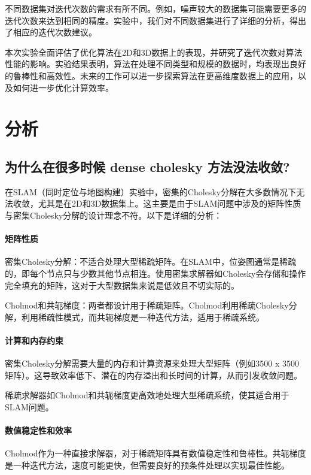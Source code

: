 \documentclass{ctexart}
\begin{document}
不同数据集对迭代次数的需求有所不同。例如，噪声较大的数据集可能需要更多的迭代次数来达到相同的精度。实验中，我们对不同数据集进行了详细的分析，得出了相应的迭代次数建议。


本次实验全面评估了优化算法在2D和3D数据上的表现，并研究了迭代次数对算法性能的影响。实验结果表明，算法在处理不同类型和规模的数据时，均表现出良好的鲁棒性和高效性。未来的工作可以进一步探索算法在更高维度数据上的应用，以及如何进一步优化计算效率。


\section{分析}

\subsection{为什么在很多时候 dense cholesky 方法没法收敛?}
在SLAM（同时定位与地图构建）实验中，密集的Cholesky分解在大多数情况下无法收敛，尤其是在2D和3D数据集上。这主要是由于SLAM问题中涉及的矩阵性质与密集Cholesky分解的设计理念不符。以下是详细的分析：

\paragraph{矩阵性质}

密集Cholesky分解：不适合处理大型稀疏矩阵。在SLAM中，位姿图通常是稀疏的，即每个节点只与少数其他节点相连。使用密集求解器如Cholesky会存储和操作完全填充的矩阵，这对于大型数据集来说是低效且不切实际的。

Cholmod和共轭梯度：两者都设计用于稀疏矩阵。Cholmod利用稀疏Cholesky分解，利用稀疏性模式，而共轭梯度是一种迭代方法，适用于稀疏系统。

\paragraph{计算和内存约束}

密集Cholesky分解需要大量的内存和计算资源来处理大型矩阵（例如3500 x 3500矩阵）。这导致效率低下、潜在的内存溢出和长时间的计算，从而引发收敛问题。

稀疏求解器如Cholmod和共轭梯度更高效地处理大型稀疏系统，使其适合用于SLAM问题。

\paragraph{数值稳定性和效率}

Cholmod作为一种直接求解器，对于稀疏矩阵具有数值稳定性和鲁棒性。共轭梯度是一种迭代方法，速度可能更快，但需要良好的预条件处理以实现最佳性能。
\end{document}
